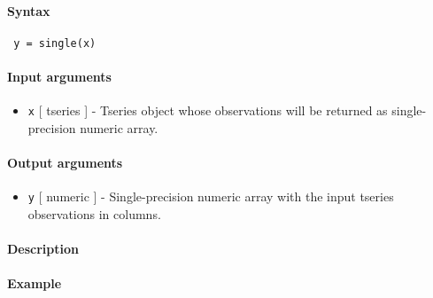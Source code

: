 


	\paragraph{Syntax}
 
 \begin{verbatim}
 y = single(x)
 \end{verbatim}
 
 \paragraph{Input arguments}
 
 \begin{itemize}
 \item
   \texttt{x} {[} tseries {]} - Tseries object whose observations will be
   returned as single-precision numeric array.
 \end{itemize}
 
 \paragraph{Output arguments}
 
 \begin{itemize}
 \item
   \texttt{y} {[} numeric {]} - Single-precision numeric array with the
   input tseries observations in columns.
 \end{itemize}
 
 \paragraph{Description}
 
 \paragraph{Example}


